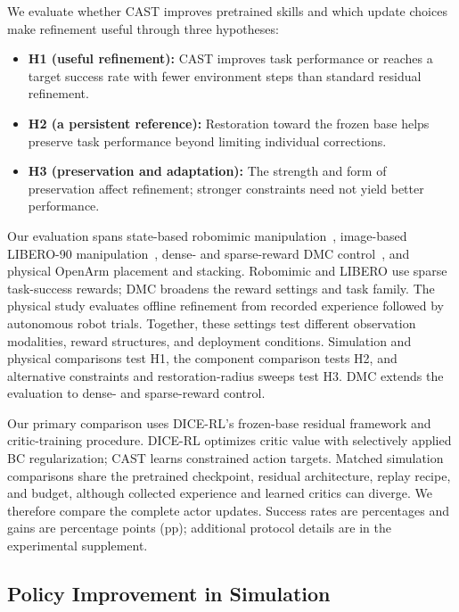 We evaluate whether CAST improves pretrained skills and which update
choices make refinement useful through three hypotheses:
\begin{itemize}
\item \textbf{H1 (useful refinement):} CAST improves task performance or
reaches a target success rate with fewer environment steps than standard
residual refinement.
\item \textbf{H2 (a persistent reference):} Restoration toward the frozen
base helps preserve task performance beyond limiting individual corrections.
\item \textbf{H3 (preservation and adaptation):} The strength and form of
preservation affect refinement; stronger constraints need not yield
better performance.
\end{itemize}

\label{sec:exp-setup}
Our evaluation spans state-based robomimic manipulation~\cite{mandlekar2021robomimic},
image-based LIBERO-90 manipulation~\cite{liu2023libero}, dense- and
sparse-reward DMC control~\cite{tassa2018dmc}, and physical OpenArm
placement and stacking. Robomimic and LIBERO use sparse task-success
rewards; DMC broadens the reward settings and task family. The physical
study evaluates offline refinement from recorded experience followed by
autonomous robot trials. Together, these settings test different observation
modalities, reward structures, and deployment conditions. Simulation and
physical comparisons test H1, the component comparison tests H2, and
alternative constraints and restoration-radius sweeps test H3. DMC extends
the evaluation to dense- and sparse-reward control.

Our primary comparison uses DICE-RL's frozen-base residual framework and
critic-training procedure. DICE-RL optimizes critic value with selectively
applied BC regularization; CAST learns constrained action targets. Matched
simulation comparisons share the pretrained checkpoint, residual
architecture, replay recipe, and budget, although collected experience and
learned critics can diverge. We therefore compare the complete actor
updates. Success rates are percentages and gains are percentage points
(pp); additional protocol details are in the experimental supplement.

\subsection{Policy Improvement in Simulation}
\label{sec:exp-libero}


